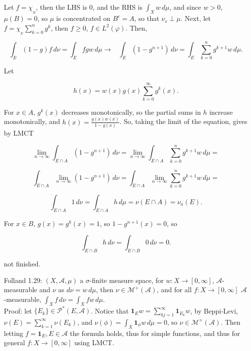 \documentclass[12pt]{article}
\newcommand{\partset}[1]{ \mathcal{P}^{*}(#1) }
\newcommand{\rarw}[0] { \rightarrow }
\newcommand{ \cf }[1] { \mathbf{1}_{#1} }
\newcommand{\A}[0] { \mathcal{A} }
\newcommand{\M}[0] { \mathcal{M} }
\begin{document}
\noindent

Let $f = \chi_{_B}$, then the LHS is $0$, and the RHS is $\int_X w \, d\mu$, and since $w > 0$, $\mu(B) = 0$, so $\mu$ is concentrated on $B^c = A$, so that $\nu_s \perp \mu$. Next, let $ f = \chi_{_E}  \sum_{k=0}^n g^k$, then $f \ge 0$, $f \in L^2(\varphi)$. Then,

$$
    \int_E (1-g) f \, d\nu = \int_E fgw \, d\mu \rarw \hspace{10pt} \int_E (1-g^{n+1}) \, d\nu = \int_E \sum_{k=0}^n g^{k+1} w \, d\mu.
$$

\noindent Let 

$$
h(x) = w(x)  g(x)\sum_{k=0}^\infty g^{k}(x).
$$

\noindent 
For $x \in A$, $g^k(x)$ decreases monotonically, so the partial sums in $h$ increase monotonically, and $ h(x) = \frac{g(x) w(x)}{1-g(x)}$. So, taking the limit of the equation, gives by LMCT 

$$
\lim_{n \rarw \infty}  \int_{E \cap A} (1-g^{n+1}) \, d\nu =  \lim_{n \rarw \infty}  \int_{E \cap A} \sum_{k=0}^n g^{k+1} w \, d\mu =
$$

$$
\int_{E \cap A}  \lim_{n \rarw \infty}  (1-g^{n+1}) \, d\nu =  \int_{E \cap A} \lim_{n \rarw \infty}   \sum_{k=0}^n g^{k+1} w \, d\mu =
$$

$$
\int_{E \cap A} 1 \, d\nu =  \int_{E \cap A} h \, d\mu = \nu(E \cap A) = \nu_a(E).
$$


\noindent 
For $x \in B$, $g(x) = g^k(x) = 1$, so $1-g^{n+1}(x) = 0$, so

$$
\int_{E \cap B} h \, d\nu = \int_{E \cap B} 0 \, d\nu = 0.
$$

\noindent
not finished.




\break

Folland 1.29: $(X ,\A, \mu)$ a $\sigma$-finite measure space, for $w: X \rarw [0,\infty]$, $\A$-measurable and $\nu$ as $d\nu = w \, d\mu $, then $\nu \in \M^+(\A)$, and for all $f:X \rarw [0, \infty]$ $\A$-measurable, $\int_X f\, d\nu = \int_X fw \, d\mu$. \\

\noindent
Proof: let $\{E_k\} \in \partset{E, \A}$. Notice that $\cf{E} w = \sum_{kj=1}^\infty \cf{E_k} w$, by Beppi-Levi, $\nu(E) = \sum_{k=1}^\infty \nu(E_k)$, and $\nu(\phi) = \int_X \cf{\phi} w \, d\mu = 0$, so $\nu \in \M^+(\A)$. Then letting $f = \cf{E}, E \in \A$ the formula  holds, thus for simple functions, and thus for general $f:X \rarw [0, \infty]$ using LMCT.\\
\end{document}
